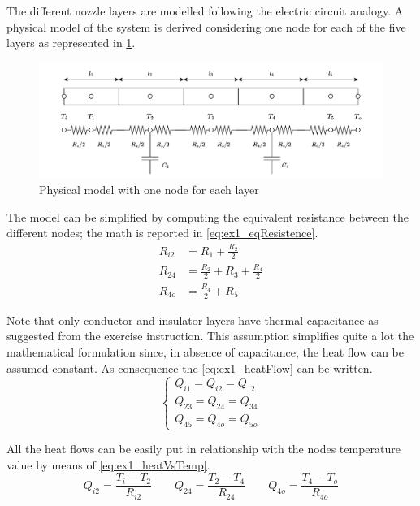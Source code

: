 \documentclass[11pt,a4paper,oneside]{article}
\begin{document}
The different nozzle layers are modelled following the electric circuit analogy. 
A physical model of the system is derived considering one node for each of the five layers as represented in \cref{fig:ex1_phyModelCase1}.
\begin{figure}[H]
    \centering
    \includegraphics[width=1\textwidth]{Figures/ex1_phyModelCase1.pdf}
    \caption[]{\label{fig:ex1_phyModelCase1} Physical model with one node for each layer}
\end{figure}

The model can be simplified by computing the equivalent resistance between the different nodes; the math is reported in \cref{eq:ex1_eqResistence}.
\begin{subequations}
    \begin{align}
        R_{i2} &= R_1 + \frac{R_2}{2}                   \label{eq:ex1_Ri2} \\
        R_{24} &= \frac{R_2}{2} + R_3 + \frac{R_4}{2}   \label{eq:ex1_R24} \\
        R_{4o} &= \frac{R_4}{2} + R_5                   \label{eq:ex1_R4o}
    \end{align}
    \label{eq:ex1_eqResistence}
\end{subequations}

Note that only conductor and insulator layers have thermal capacitance as suggested from the exercise instruction.
This assumption simplifies quite a lot the mathematical formulation since, in absence of capacitance, the heat flow can be assumed constant.
As consequence the \cref{eq:ex1_heatFlow} can be written.
\begin{equation}
    \begin{cases}
        Q_{i1} = Q_{i2} = Q_{12} \\
        Q_{23} = Q_{24} = Q_{34} \\
        Q_{45} = Q_{4o} = Q_{5o} 
    \end{cases}
    \label{eq:ex1_heatFlow}
\end{equation}

All the heat flows can be easily put in relationship with the nodes temperature value by means of \cref{eq:ex1_heatVsTemp}.
\begin{equation}
    Q_{i2} = \frac{T_i-T_2}{R_{i2}}  \qquad Q_{24} = \frac{T_2-T_4}{R_{24}}  \qquad Q_{4o} = \frac{T_4-T_o}{R_{4o}}
    \label{eq:ex1_heatVsTemp}
\end{equation}
\end{document}

